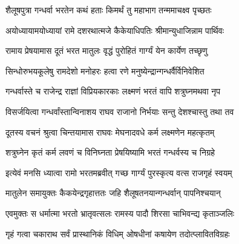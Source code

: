 
\translink{}

\storymeta



\twolineshloka
{शैलूषपुत्रा गन्धर्वा भरतेन कथं हताः}
{किमर्थं तु महाभाग तन्ममाचक्ष्व पृच्छतः}%


\twolineshloka
{अयोध्यायामयोध्यायां रामे दशरथात्मजे}
{कैकेयाधिपतिः श्रीमान्युधाजिन्नाम पार्थिवः}%

\twolineshloka
{रामाय प्रेषयामास दूतं भरत मातुलः}
{वृद्धं पुरोहितं गार्ग्यं येन कार्येण तच्छृणु}%

\twolineshloka
{सिन्धोरुभयकूलेषु रामदेशो मनोहरः}
{हत्वा रणे मनुष्येन्द्रान्गन्धर्वैर्विनिवेशित}%

\twolineshloka
{गन्धर्वास्ते च राजेन्द्र राज्ञां विप्रियकारकाः}
{लक्ष्मणं भरतं वापि शत्रुघ्नमथवा नृप}%

\twolineshloka
{विसर्जयित्वा गन्धर्वांस्तान्विनाशय राघव}
{राजानो निर्भयाः सन्तु देशश्चास्तु तथा तव}%

\twolineshloka
{दूतस्य वचनं श्रुत्वा चिन्तयामास राघवः}
{मेघनादवधे कर्म लक्ष्मणेन महत्कृतम्}%

\twolineshloka
{शत्रुघ्नेन कृतं कर्म लवणं च विनिघ्नता}
{प्रेषयिष्यामि भरतं गन्धर्वस्य च निग्रहे}%

\twolineshloka
{इत्येवं मनसि ध्यात्वा रामो भरतमब्रवीत्}
{गच्छ गार्ग्यं पुरस्कृत्य वत्स राजगृहं स्वयम्}%

\twolineshloka
{मातुलेन समायुक्तः कैकयेन्द्रगृहात्ततः}
{जहि शैलूषतनयान्गन्धर्वान् पापनिश्चयान्}%

\twolineshloka
{एवमुक्तः स धर्मात्मा भरतो भ्रातृवत्सलः}
{रामस्य पादौ शिरसा चाभिवन्द्य कृताञ्जलिः}%

\twolineshloka
{गृहं गत्वा चकाराथ सर्वं प्रास्थानिकं विधिम्}
{ओषधीनां कषायेण तदोत्प्लावितविग्रहः}%


